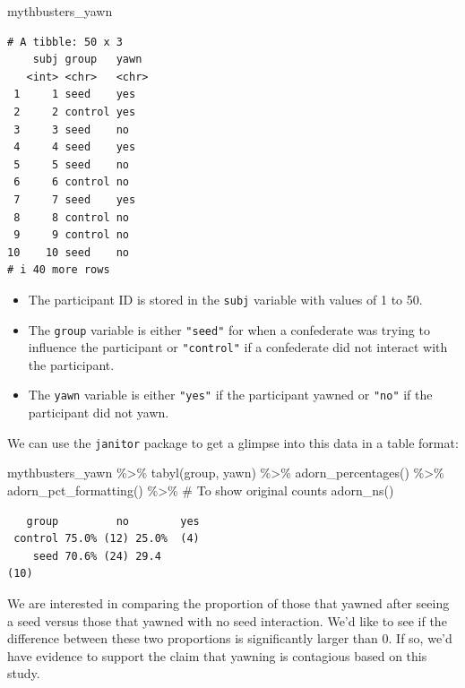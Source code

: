 \documentclass[
  letterpaper,
  DIV=11,
  numbers=noendperiod]{scrreprt}
\newenvironment{Shaded}{\begin{snugshade}}{\end{snugshade}}
\newcommand{\CommentTok}[1]{\textcolor[rgb]{0.37,0.37,0.37}{#1}}
\newcommand{\FunctionTok}[1]{\textcolor[rgb]{0.28,0.35,0.67}{#1}}
\newcommand{\NormalTok}[1]{\textcolor[rgb]{0.00,0.23,0.31}{#1}}
\newcommand{\SpecialCharTok}[1]{\textcolor[rgb]{0.37,0.37,0.37}{#1}}
\providecommand{\tightlist}{%
  \setlength{\itemsep}{0pt}\setlength{\parskip}{0pt}}\usepackage{longtable,booktabs,array}
\theoremstyle{definition}
\theoremstyle{remark}
\begin{document}
\begin{Shaded}
\begin{Highlighting}[]
\NormalTok{mythbusters\_yawn}
\end{Highlighting}
\end{Shaded}

\begin{verbatim}
# A tibble: 50 x 3
    subj group   yawn 
   <int> <chr>   <chr>
 1     1 seed    yes  
 2     2 control yes  
 3     3 seed    no   
 4     4 seed    yes  
 5     5 seed    no   
 6     6 control no   
 7     7 seed    yes  
 8     8 control no   
 9     9 control no   
10    10 seed    no   
# i 40 more rows
\end{verbatim}

\begin{itemize}
\tightlist
\item
  The participant ID is stored in the \texttt{subj} variable with values
  of 1 to 50.
\item
  The \texttt{group} variable is either \texttt{"seed"} for when a
  confederate was trying to influence the participant or
  \texttt{"control"} if a confederate did not interact with the
  participant.
\item
  The \texttt{yawn} variable is either \texttt{"yes"} if the participant
  yawned or \texttt{"no"} if the participant did not yawn.
\end{itemize}

We can use the \texttt{janitor} package to get a glimpse into this data
in a table format:

\begin{Shaded}
\begin{Highlighting}[]
\NormalTok{mythbusters\_yawn }\SpecialCharTok{\%\textgreater{}\%} 
  \FunctionTok{tabyl}\NormalTok{(group, yawn) }\SpecialCharTok{\%\textgreater{}\%} 
  \FunctionTok{adorn\_percentages}\NormalTok{() }\SpecialCharTok{\%\textgreater{}\%} 
  \FunctionTok{adorn\_pct\_formatting}\NormalTok{() }\SpecialCharTok{\%\textgreater{}\%} 
  \CommentTok{\# To show original counts}
  \FunctionTok{adorn\_ns}\NormalTok{()}
\end{Highlighting}
\end{Shaded}

\begin{verbatim}
   group         no        yes
 control 75.0% (12) 25.0%  (4)
    seed 70.6% (24) 29.4                                               (10)
\end{verbatim}

We are interested in comparing the proportion of those that yawned after
seeing a seed versus those that yawned with no seed interaction. We'd
like to see if the difference between these two proportions is
significantly larger than 0. If so, we'd have evidence to support the
claim that yawning is contagious based on this study.
\end{document}
